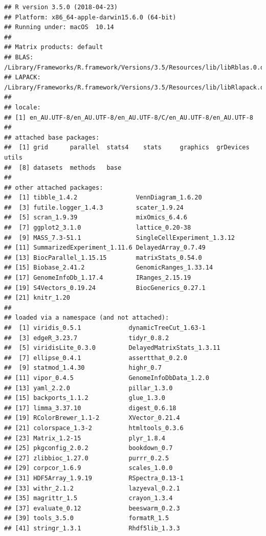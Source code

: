 \documentclass[]{book}
\theoremstyle{definition}
\theoremstyle{definition}
\theoremstyle{definition}
\theoremstyle{remark}
\begin{document}
\begin{verbatim}
## R version 3.5.0 (2018-04-23)
## Platform: x86_64-apple-darwin15.6.0 (64-bit)
## Running under: macOS  10.14
## 
## Matrix products: default
## BLAS: /Library/Frameworks/R.framework/Versions/3.5/Resources/lib/libRblas.0.dylib
## LAPACK: /Library/Frameworks/R.framework/Versions/3.5/Resources/lib/libRlapack.dylib
## 
## locale:
## [1] en_AU.UTF-8/en_AU.UTF-8/en_AU.UTF-8/C/en_AU.UTF-8/en_AU.UTF-8
## 
## attached base packages:
##  [1] grid      parallel  stats4    stats     graphics  grDevices utils    
##  [8] datasets  methods   base     
## 
## other attached packages:
##  [1] tibble_1.4.2                VennDiagram_1.6.20         
##  [3] futile.logger_1.4.3         scater_1.9.24              
##  [5] scran_1.9.39                mixOmics_6.4.6             
##  [7] ggplot2_3.1.0               lattice_0.20-38            
##  [9] MASS_7.3-51.1               SingleCellExperiment_1.3.12
## [11] SummarizedExperiment_1.11.6 DelayedArray_0.7.49        
## [13] BiocParallel_1.15.15        matrixStats_0.54.0         
## [15] Biobase_2.41.2              GenomicRanges_1.33.14      
## [17] GenomeInfoDb_1.17.4         IRanges_2.15.19            
## [19] S4Vectors_0.19.24           BiocGenerics_0.27.1        
## [21] knitr_1.20                 
## 
## loaded via a namespace (and not attached):
##  [1] viridis_0.5.1             dynamicTreeCut_1.63-1    
##  [3] edgeR_3.23.7              tidyr_0.8.2              
##  [5] viridisLite_0.3.0         DelayedMatrixStats_1.3.11
##  [7] ellipse_0.4.1             assertthat_0.2.0         
##  [9] statmod_1.4.30            highr_0.7                
## [11] vipor_0.4.5               GenomeInfoDbData_1.2.0   
## [13] yaml_2.2.0                pillar_1.3.0             
## [15] backports_1.1.2           glue_1.3.0               
## [17] limma_3.37.10             digest_0.6.18            
## [19] RColorBrewer_1.1-2        XVector_0.21.4           
## [21] colorspace_1.3-2          htmltools_0.3.6          
## [23] Matrix_1.2-15             plyr_1.8.4               
## [25] pkgconfig_2.0.2           bookdown_0.7             
## [27] zlibbioc_1.27.0           purrr_0.2.5              
## [29] corpcor_1.6.9             scales_1.0.0             
## [31] HDF5Array_1.9.19          RSpectra_0.13-1          
## [33] withr_2.1.2               lazyeval_0.2.1           
## [35] magrittr_1.5              crayon_1.3.4             
## [37] evaluate_0.12             beeswarm_0.2.3           
## [39] tools_3.5.0               formatR_1.5              
## [41] stringr_1.3.1             Rhdf5lib_1.3.3           

\end{verbatim}
\end{document}
